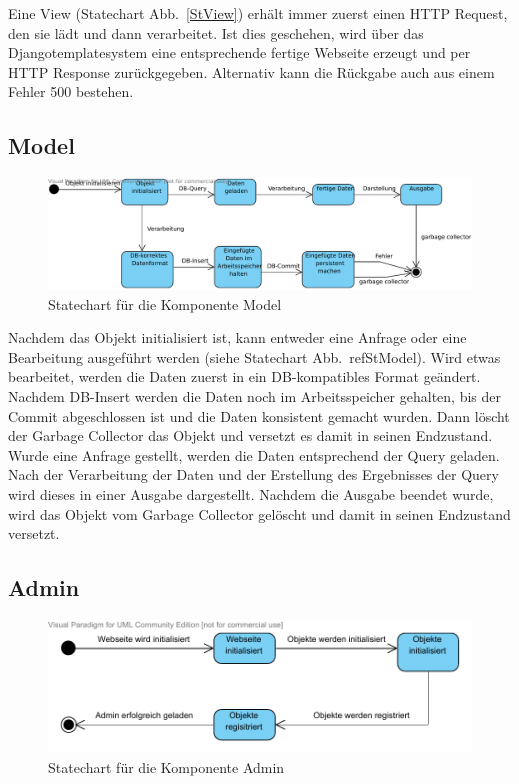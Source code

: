 Eine View (Statechart Abb.\ \ref{StView}) erhält immer zuerst einen HTTP 
Request, den sie lädt und dann verarbeitet. Ist dies geschehen, wird über das 
Djangotemplatesystem eine entsprechende fertige Webseite erzeugt und per HTTP 
Response zurückgegeben. Alternativ kann die Rückgabe auch aus einem Fehler 500 
bestehen.

\subsection{Model}
\begin{figure}[H]
\includegraphics[width=0.8\linewidth]{bilder/KompModel.pdf}
\caption{Statechart für die Komponente Model}
\label{StModel}
\end{figure}

Nachdem das Objekt initialisiert ist, kann entweder eine Anfrage oder eine
Bearbeitung ausgeführt werden (siehe Statechart Abb.\ ref{StModel}). Wird etwas 
bearbeitet, werden die Daten zuerst in ein DB-kompatibles Format geändert. 
Nachdem DB-Insert werden die Daten noch im Arbeitsspeicher gehalten, bis der 
Commit abgeschlossen ist und die Daten konsistent gemacht wurden. Dann löscht 
der Garbage Collector das Objekt und versetzt es damit in seinen Endzustand. 
Wurde eine Anfrage gestellt, werden die Daten entsprechend der Query geladen. 
Nach der Verarbeitung der Daten und der Erstellung des Ergebnisses der Query 
wird dieses in einer Ausgabe dargestellt. Nachdem die Ausgabe beendet wurde, 
wird das Objekt vom Garbage Collector gelöscht und damit in seinen Endzustand 
versetzt.

\subsection{Admin}
\begin{figure}[H]
\includegraphics[width=0.8\linewidth]{bilder/KompAdmin.pdf}
\caption{Statechart für die Komponente Admin}
\label{StAdmin}
\end{figure}


